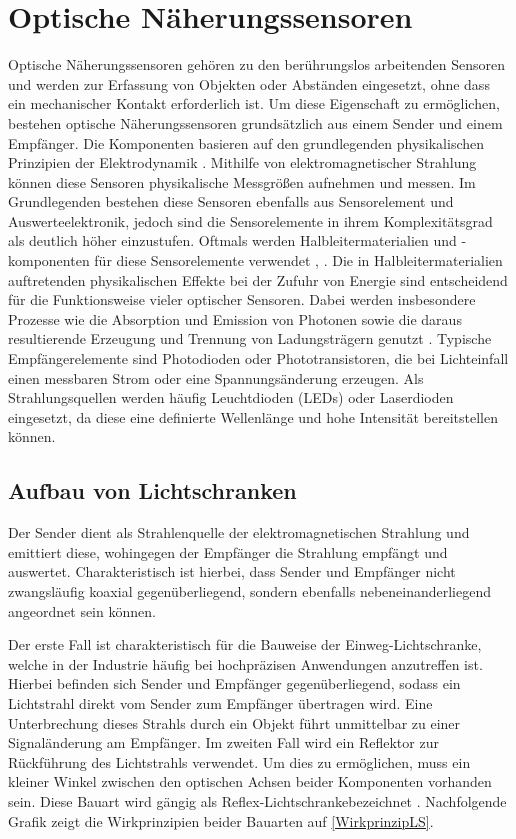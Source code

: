 \section{Optische Näherungssensoren}
Optische Näherungssensoren gehören zu den berührungslos arbeitenden Sensoren und werden zur Erfassung von Objekten oder Abständen eingesetzt, ohne dass ein mechanischer Kontakt erforderlich ist. Um diese Eigenschaft zu ermöglichen, bestehen optische Näherungssensoren grundsätzlich aus einem Sender und einem Empfänger.
Die Komponenten basieren auf den grundlegenden physikalischen Prinzipien der Elektrodynamik \cite{Roddeck:2023}. Mithilfe von elektromagnetischer Strahlung können diese Sensoren physikalische Messgrößen aufnehmen und messen. Im Grundlegenden bestehen diese Sensoren ebenfalls aus Sensorelement und Auswerteelektronik, jedoch sind die Sensorelemente in ihrem Komplexitätsgrad als deutlich höher einzustufen. Oftmals werden Halbleitermaterialien und -komponenten für diese Sensorelemente verwendet \cite{Roddeck:2023}, \cite{Loeffler-Mang:2012}. Die in Halbleitermaterialien auftretenden physikalischen Effekte bei der Zufuhr von Energie sind entscheidend für die Funktionsweise vieler optischer Sensoren. Dabei werden insbesondere Prozesse wie die Absorption und Emission von Photonen sowie die daraus resultierende Erzeugung und Trennung von Ladungsträgern genutzt \cite{Feynman:2020}. 
Typische Empfängerelemente sind Photodioden oder Phototransistoren, die bei Lichteinfall einen messbaren Strom oder eine Spannungsänderung erzeugen. Als Strahlungsquellen werden häufig Leuchtdioden (LEDs) oder Laserdioden eingesetzt, da diese eine definierte Wellenlänge und hohe Intensität bereitstellen können. \cite{Loeffler-Mang:2012}

\subsection{Aufbau von Lichtschranken}

Der Sender dient als Strahlenquelle der elektromagnetischen Strahlung und emittiert diese, wohingegen der Empfänger die Strahlung empfängt und auswertet. Charakteristisch ist hierbei, dass Sender und Empfänger nicht zwangsläufig koaxial gegenüberliegend, sondern ebenfalls nebeneinanderliegend angeordnet sein können. 

Der erste Fall ist charakteristisch für die Bauweise der \glqq Einweg-Lichtschranke\grqq, welche in der Industrie häufig bei hochpräzisen Anwendungen anzutreffen ist. Hierbei befinden sich Sender und Empfänger gegenüberliegend, sodass ein Lichtstrahl direkt vom Sender zum Empfänger übertragen wird. Eine Unterbrechung dieses Strahls durch ein Objekt führt unmittelbar zu einer Signaländerung am Empfänger.
Im zweiten Fall wird ein Reflektor zur Rückführung des Lichtstrahls verwendet. Um dies zu ermöglichen, muss ein kleiner Winkel zwischen den optischen Achsen beider Komponenten vorhanden sein. Diese Bauart wird gängig als \glqq Reflex-Lichtschranke\grqq \space bezeichnet \cite{Loeffler-Mang:2012}. Nachfolgende Grafik zeigt die Wirkprinzipien beider Bauarten auf \ref{WirkprinzipLS}.

